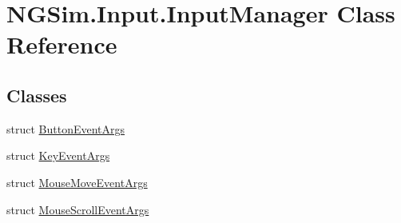 \hypertarget{class_n_g_sim_1_1_input_1_1_input_manager}{}\section{N\+G\+Sim.\+Input.\+Input\+Manager Class Reference}
\label{class_n_g_sim_1_1_input_1_1_input_manager}
\subsection*{Classes}
\begin{DoxyCompactItemize}
\item 
struct \hyperlink{struct_n_g_sim_1_1_input_1_1_input_manager_1_1_button_event_args}{Button\+Event\+Args}
\item 
struct \hyperlink{struct_n_g_sim_1_1_input_1_1_input_manager_1_1_key_event_args}{Key\+Event\+Args}
\item 
struct \hyperlink{struct_n_g_sim_1_1_input_1_1_input_manager_1_1_mouse_move_event_args}{Mouse\+Move\+Event\+Args}
\item 
struct \hyperlink{struct_n_g_sim_1_1_input_1_1_input_manager_1_1_mouse_scroll_event_args}{Mouse\+Scroll\+Event\+Args}
\end{DoxyCompactItemize}
